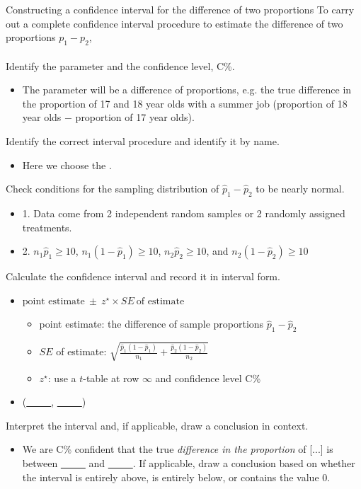 \begin{onebox}{Constructing a confidence interval for the difference of two proportions}
To carry out a complete confidence interval procedure to estimate the difference of two proportions $p_1-p_2$,
\\
\\
  Identify the parameter and the confidence level, C\%.\vspace{-1mm}
\begin{itemize}
\item[]  The parameter will be a difference of proportions, e.g. the true difference in the proportion of 17 and 18 year olds with a summer job (proportion of 18 year olds $-$ proportion of 17 year olds).
\end{itemize} \vspace{-1mm}
 Identify the correct interval procedure and identify it by name. \vspace{-1mm}
\begin{itemize}
\item[] Here we choose the .
\end{itemize}
  Check conditions for the sampling distribution of $\hat{p}_1-\hat{p}_2$ to be nearly normal.\vspace{-1mm}
\begin{itemize}
\setlength{\itemsep}{0mm}
\item[] 1. Data come from 2 independent random samples or 2 randomly assigned \mbox{treatments.}
\item[] 2.  $n_1\hat{p}_1\geq10$, $n_1(1-\hat{p}_1)\geq10$,  $n_2\hat{p}_2\geq10$, and $n_2(1-\hat{p}_2)\geq10$
\end{itemize}
   Calculate the confidence interval and record it in interval form.
\begin{itemize}
\item[] $\text{point estimate}\ \pm\ z^{\star} \times SE\ \text{of estimate}$
\begin{itemize}
\item[] point estimate:  the difference of sample proportions $\hat{p}_1 - \hat{p}_2$
\item[] $SE$ of estimate:  $\sqrt{\frac{\hat{p}_1(1-\hat{p}_1)}{n_1} + \frac{\hat{p}_2(1-\hat{p}_2)}{n_2}}$\item[] $z^{\star}$: use a $t$-table at row $\infty$ and confidence level C\%
\end{itemize}
\item[] (\underline{\ \ \ \ \ }, \underline{\ \ \ \ \ })
\end{itemize}
   Interpret the interval and, if applicable, draw a conclusion in context.\vspace{-1mm}
\begin{itemize}
\item[] We are C\% confident that the true \emph{difference in the proportion} of [...]  is between \underline{\ \ \ \ \ } and \underline{\ \ \ \ \ }.  If applicable, draw a conclusion based on whether the interval is entirely above, is entirely below, or contains the value 0.  


\end{itemize}
\end{onebox}
